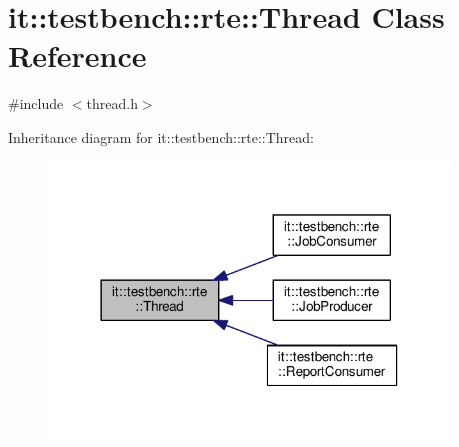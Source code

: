 \hypertarget{classit_1_1testbench_1_1rte_1_1Thread}{\section{it\-:\-:testbench\-:\-:rte\-:\-:Thread Class Reference}
\label{df/df6/classit_1_1testbench_1_1rte_1_1Thread}
}


{\ttfamily \#include $<$thread.\-h$>$}



Inheritance diagram for it\-:\-:testbench\-:\-:rte\-:\-:Thread\-:
\nopagebreak
\begin{figure}[H]
\begin{center}
\leavevmode
\includegraphics[width=302pt]{df/dbf/classit_1_1testbench_1_1rte_1_1Thread__inherit__graph}
\end{center}
\end{figure}
